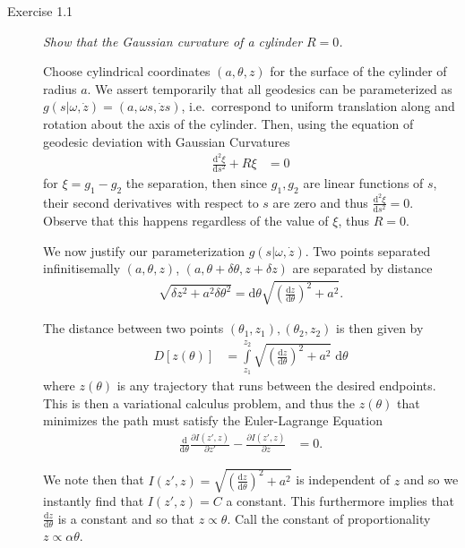 \documentclass[12pt]{report}
\newcommand{\rd}[2]{\frac{\mathrm{d}#1}{\mathrm{d}#2}}
\newcommand{\pd}[2]{\frac{\partial#1}{\partial#2}}
\newcommand{\rtd}[2]{\frac{\mathrm{d}^2#1}{\mathrm{d}#2^2}}
\begin{document}
\begin{description}
    \item[Exercise 1.1] \emph{Show that the Gaussian curvature of a cylinder
        $R=0$.}

        Choose cylindrical coordinates $(a, \theta, z)$ for the surface of the
        cylinder of radius $a$. We assert temporarily that all geodesics can be
        parameterized as $g(s|\omega, \dot{z}) = (a, \omega s, \dot{z}s)$, i.e.\
        correspond to uniform translation along and rotation about the axis of
        the cylinder. Then, using the equation of geodesic deviation with
        Gaussian Curvatures
        \begin{align*}
            \rtd{\xi}{s} + R\xi &= 0
        \end{align*}
        for $\xi = g_1 - g_2$ the separation, then since $g_1, g_2$ are linear
        functions of $s$, their second derivatives with respect to $s$ are zero
        and thus $\rtd{\xi}{s} = 0$. Observe that this happens regardless of the
        value of $\xi$, thus $R=0$.

        We now justify our parameterization $g(s|\omega, \dot{z})$. Two points
        separated infinitisemally $(a, \theta, z)$, $(a, \theta + \delta\theta, z
        + \delta z)$ are separated by distance
        \begin{align*}
            \sqrt{\delta z^2 + a^2 \delta \theta^2} =
                \mathrm{d}\theta\sqrt{\left(\rd{z}{\theta}\right)^2 + a^2}.
        \end{align*}

        The distance between two points $(\theta_1, z_1), (\theta_2, z_2)$ is
        then given by
        \begin{align*}
            D[z(\theta)] &= \int\limits_{z_1}^{z_2}
                \sqrt{\left(\rd{z}{\theta}\right)^2 + a^2}\;\mathrm{d}\theta
        \end{align*}
        where $z(\theta)$ is any trajectory that runs between the desired
        endpoints. This is then a variational calculus problem, and thus the
        $z(\theta)$ that minimizes the path must satisfy the Euler-Lagrange
        Equation
        \begin{align*}
            \rd{}{\theta}\pd{I(z', z)}{z'} - \pd{I(z', z)}{z} &= 0.
        \end{align*}

        We note then that
        $I(z', z) = \sqrt{\left(\rd{z}{\theta}\right)^2 + a^2}$ is independent
        of $z$ and so we instantly find that $I(z',z) = C$ a constant. This
        furthermore implies that $\rd{z}{\theta}$ is a constant and so that $z
        \propto \theta$. Call the constant of proportionality $z \propto \alpha
        \theta$.


\end{description}
\end{document}
